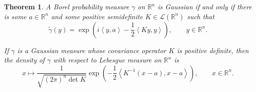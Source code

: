 \documentclass{article}
\newcommand{\inner}[2]{\left\langle #1, #2 \right\rangle}
\newtheorem{theorem}{Theorem}
\theoremstyle{definition}
\begin{document}
\begin{theorem}
A Borel probability measure $\gamma$ on $\mathbb{R}^n$ is Gaussian if and only if there is some
$a \in \mathbb{R}^n$ and some positive semidefinite  $K \in \mathscr{L}(\mathbb{R}^n)$ such that
\begin{equation}
\widetilde{\gamma}(y) = \exp\left(i \inner{y}{a} - \frac{1}{2} \inner{Ky}{y} \right), \qquad
y \in \mathbb{R}^n.
\label{GaussianRn}
\end{equation}

If $\gamma$ is a Gaussian measure whose  covariance operator $K$  is positive definite, then 
the density of $\gamma$ with respect to Lebesgue measure on $\mathbb{R}^n$ is 
\[
x \mapsto \frac{1}{\sqrt{(2\pi)^n \det K}} \exp\left(-\frac{1}{2}\inner{K^{-1}(x-a)}{x-a}\right),
\qquad x \in \mathbb{R}^n.
\]
\label{density}
\end{theorem}
\end{document}
